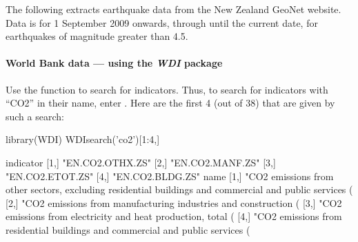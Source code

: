   The following
extracts earthquake data from the New Zealand GeoNet
website.  Data is for 1 September 2009 onwards, through until the
current date, for earthquakes of magnitude greater than 4.5.
\begin{Schunk}
\end{Schunk}

\paragraph{World Bank data --- using the {\em WDI} package}

Use the function  to search for indicators.  Thus,
to search for indicators with ``CO2'' in their name, enter
.  Here are the first 4 (out of 38) that are
given by such a search:
\begin{fullwidth}
\begin{Schunk}
\begin{Sinput}
library(WDI)
WDIsearch('co2')[1:4,]
\end{Sinput}
\begin{Soutput}
     indicator       
[1,] "EN.CO2.OTHX.ZS"
[2,] "EN.CO2.MANF.ZS"
[3,] "EN.CO2.ETOT.ZS"
[4,] "EN.CO2.BLDG.ZS"
     name                                                                                                                               
[1,] "CO2 emissions from other sectors, excluding residential buildings and commercial and public services (% of total fuel combustion)"
[2,] "CO2 emissions from manufacturing industries and construction (% of total fuel combustion)"                                        
[3,] "CO2 emissions from electricity and heat production, total (% of total fuel combustion)"                                           
[4,] "CO2 emissions from residential buildings and commercial and public services (% of total fuel combustion)"                         
\end{Soutput}
\end{Schunk}
\end{fullwidth}

